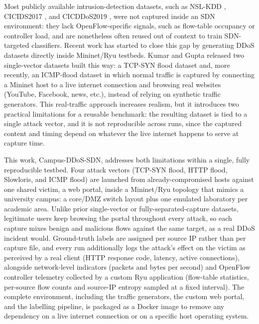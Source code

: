 \documentclass[ASNA,twocolumn]{USG}
\begin{document}
Most publicly available intrusion-detection datasets, such as NSL-KDD \citep{tavallaee2009nslkdd}, CICIDS2017 \citep{sharafaldin2018cicflowmeter}, and CICDDoS2019 \citep{sharafaldin2019cicddos2019}, were not captured inside an SDN environment: they lack OpenFlow-specific signals, such as flow-table occupancy or controller load, and are nonetheless often reused out of context to train SDN-targeted classifiers. Recent work has started to close this gap by generating DDoS datasets directly inside Mininet/Ryu testbeds. Kumar and Gupta released two single-vector datasets built this way: a TCP-SYN flood dataset \citep{kumar2025synflood} and, more recently, an ICMP-flood dataset \citep{kumar2026icmpfloodsdn} in which normal traffic is captured by connecting a Mininet host to a live internet connection and browsing real websites (YouTube, Facebook, news, etc.), instead of relying on synthetic traffic generators. This real-traffic approach increases realism, but it introduces two practical limitations for a reusable benchmark: the resulting dataset is tied to a single attack vector, and it is not reproducible across runs, since the captured content and timing depend on whatever the live internet happens to serve at capture time.

This work, Campus-DDoS-SDN, addresses both limitations within a single, fully reproducible testbed. Four attack vectors (TCP-SYN flood, HTTP flood, Slowloris, and ICMP flood) are launched from already-compromised hosts against one shared victim, a web portal, inside a Mininet/Ryu topology that mimics a university campus: a core/DMZ switch layout plus one emulated laboratory per academic area. Unlike prior single-vector or fully-separated-capture datasets, legitimate users keep browsing the portal throughout every attack, so each capture mixes benign and malicious flows against the same target, as a real DDoS incident would. Ground-truth labels are assigned per source IP rather than per capture file, and every run additionally logs the attack's effect on the victim as perceived by a real client (HTTP response code, latency, active connections), alongside network-level indicators (packets and bytes per second) and OpenFlow controller telemetry collected by a custom Ryu application (flow-table statistics, per-source flow counts and source-IP entropy sampled at a fixed interval). The complete environment, including the traffic generators, the custom web portal, and the labelling pipeline, is packaged as a Docker image to remove any dependency on a live internet connection or on a specific host operating system.
\end{document}
